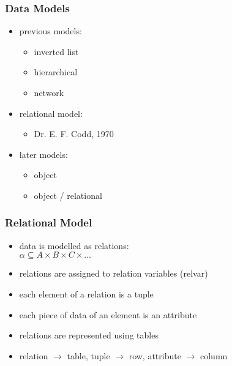 \documentclass[dvipsnames]{beamer}
\theoremstyle{plain}
\begin{document}
\begin{frame}
  \frametitle{Data Models}

  \begin{itemize}
    \item previous models:
    \begin{itemize}
      \item inverted list
      \item hierarchical
      \item network
    \end{itemize}

    \pause
    \item relational model:
    \begin{itemize}
      \item Dr. E. F. Codd, 1970
    \end{itemize}

    \pause
    \item later models:
    \begin{itemize}
      \item object
      \item object / relational
    \end{itemize}
  \end{itemize}
\end{frame}

\begin{frame}
  \frametitle{Relational Model}

  \begin{itemize}
    \item data is modelled as \alert{relations}:\\
      $\alpha \subseteq A \times B \times C \times ...$

    \pause
    \medskip
    \item relations are assigned to \alert{relation variables} (\alert{relvar})
    \item each element of a relation is a \alert{tuple}
    \item each piece of data of an element is an \alert{attribute}

    \pause
    \medskip
    \item relations are represented using tables
    \item relation $\rightarrow$ table, tuple $\rightarrow$ row,
      attribute $\rightarrow$ column
  \end{itemize}
\end{frame}
\end{document}
